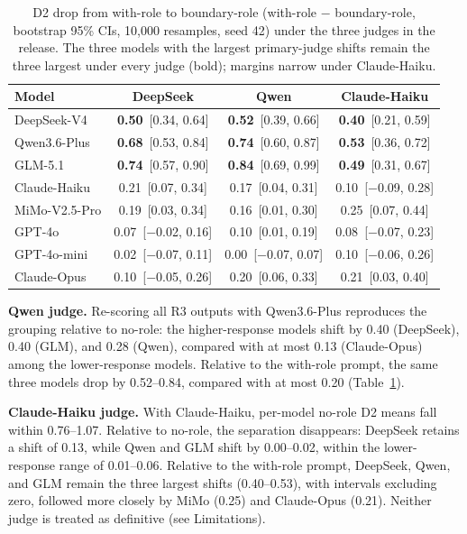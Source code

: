 \documentclass[11pt]{article}
\begin{document}
\begin{table}[h]
\centering
\scriptsize
\setlength{\tabcolsep}{3pt}
\begin{tabular}{@{}l c c c@{}}
\toprule
Model & DeepSeek & Qwen & Claude-Haiku \\
\midrule
DeepSeek-V4 & \textbf{0.50}~{\tiny[0.34, 0.64]} & \textbf{0.52}~{\tiny[0.39, 0.66]} & \textbf{0.40}~{\tiny[0.21, 0.59]} \\
Qwen3.6-Plus & \textbf{0.68}~{\tiny[0.53, 0.84]} & \textbf{0.74}~{\tiny[0.60, 0.87]} & \textbf{0.53}~{\tiny[0.36, 0.72]} \\
GLM-5.1 & \textbf{0.74}~{\tiny[0.57, 0.90]} & \textbf{0.84}~{\tiny[0.69, 0.99]} & \textbf{0.49}~{\tiny[0.31, 0.67]} \\
Claude-Haiku & 0.21~{\tiny[0.07, 0.34]} & 0.17~{\tiny[0.04, 0.31]} & 0.10~{\tiny[$-$0.09, 0.28]} \\
MiMo-V2.5-Pro & 0.19~{\tiny[0.03, 0.34]} & 0.16~{\tiny[0.01, 0.30]} & 0.25~{\tiny[0.07, 0.44]} \\
GPT-4o & 0.07~{\tiny[$-$0.02, 0.16]} & 0.10~{\tiny[0.01, 0.19]} & 0.08~{\tiny[$-$0.07, 0.23]} \\
GPT-4o-mini & 0.02~{\tiny[$-$0.07, 0.11]} & 0.00~{\tiny[$-$0.07, 0.07]} & 0.10~{\tiny[$-$0.06, 0.26]} \\
Claude-Opus & 0.10~{\tiny[$-$0.05, 0.26]} & 0.20~{\tiny[0.06, 0.33]} & 0.21~{\tiny[0.03, 0.40]} \\
\bottomrule
\end{tabular}
\caption{D2 drop from with-role to boundary-role (with-role $-$ boundary-role, bootstrap 95\% CIs, 10,000 resamples, seed 42) under the three judges in the release. The three models with the largest primary-judge shifts remain the three largest under every judge (bold); margins narrow under Claude-Haiku.}
\label{tab:app-contrast}
\end{table}

\textbf{Qwen judge.} Re-scoring all R3 outputs with Qwen3.6-Plus reproduces the grouping relative to no-role: the higher-response models shift by 0.40 (DeepSeek), 0.40 (GLM), and 0.28 (Qwen), compared with at most 0.13 (Claude-Opus) among the lower-response models. Relative to the with-role prompt, the same three models drop by 0.52--0.84, compared with at most 0.20 (Table~\ref{tab:app-contrast}).

\textbf{Claude-Haiku judge.} With Claude-Haiku, per-model no-role D2 means fall within 0.76--1.07. Relative to no-role, the separation disappears: DeepSeek retains a shift of 0.13, while Qwen and GLM shift by 0.00--0.02, within the lower-response range of 0.01--0.06. Relative to the with-role prompt, DeepSeek, Qwen, and GLM remain the three largest shifts (0.40--0.53), with intervals excluding zero, followed more closely by MiMo (0.25) and Claude-Opus (0.21). Neither judge is treated as definitive (see Limitations).
\end{document}
